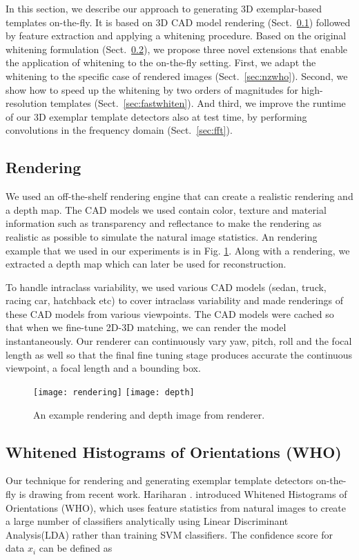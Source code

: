 In this section, we describe our approach to generating 3D
exemplar-based templates on-the-fly. It is based on 3D CAD model
rendering (Sect.~\ref{sec:rendering}) followed by feature extraction
and applying a whitening procedure. Based on the original whitening
formulation (Sect.~\ref{sec:who}), we propose three novel extensions that
enable the application of whitening to the on-the-fly setting.
%
First, we adapt the whitening to the specific case of rendered
images (Sect.~\ref{sec:nzwho}). Second, we show how to speed up the
whitening by two orders of magnitudes for high-resolution templates
(Sect.~\ref{sec:fastwhiten}). And third, we improve the runtime of our
3D exemplar template detectors also at test time, by performing
convolutions in the frequency domain (Sect.~\ref{sec:fft}).


\subsection{Rendering}
\label{sec:rendering}

We used an off-the-shelf rendering engine that can create a realistic rendering
and a depth map. The CAD models we used contain color, texture and material
information such as transparency and reflectance to make the rendering as
realistic as possible to simulate the natural image statistics. An rendering
example that we used in our experiments is in Fig. \ref{fig:rendering}. Along
with a rendering, we extracted a depth map which can later be used for
reconstruction.

To handle intraclass variability, we used various CAD models (sedan, truck,
racing car, hatchback etc) to cover intraclass variability and made renderings
of these CAD models from various viewpoints. The CAD models were cached so that
when we fine-tune 2D-3D matching, we can render the model instantaneously. Our
renderer can continuously vary yaw, pitch, roll and the focal length as well so
that the final fine tuning stage produces accurate the continuous viewpoint, a
focal length and a bounding box.

\begin{figure}[t]
  \begin{center}
    \texttt{[image: rendering]}
    \texttt{[image: depth]}
  \end{center}
  \caption{An example rendering and depth image from renderer.}
  \label{fig:rendering}
\end{figure}


\subsection{Whitened Histograms of Orientations (WHO)}
\label{sec:who}
Our technique for rendering and generating exemplar template detectors
on-the-fly is drawing from recent work. Hariharan \etal. introduced Whitened
Histograms of Orientations (WHO), which uses feature statistics from natural
images to create a large number of classifiers analytically using Linear
Discriminant Analysis(LDA) rather than training SVM
classifiers\cite{Hariharan12}. The confidence score for data $x_i$ can be defined as 


